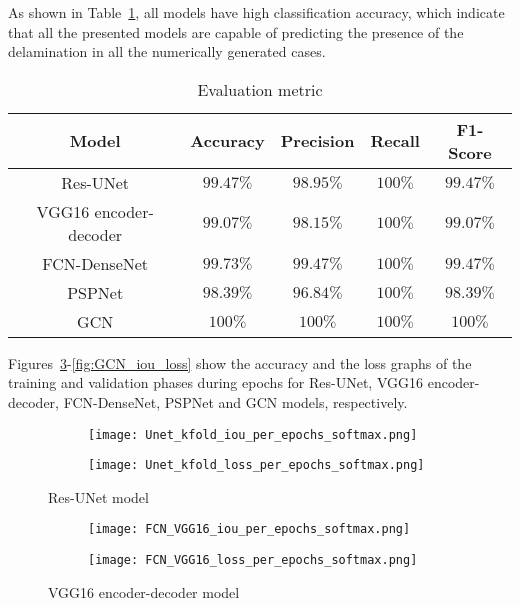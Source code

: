 As shown in Table~\ref{tab:evaluation_metric}, all models have high classification accuracy, which indicate that all the presented models are capable of predicting the presence of the delamination in all the numerically generated cases. 
\begin{table}[]
	\centering
	\caption{Evaluation metric}
	\label{tab:evaluation_metric}
	\resizebox{\textwidth}{!}
	{
		\begin{tabular}{ccccc} \hline
			Model& Accuracy & Precision & Recall & F1-Score \\ \hline
			Res-UNet & \(99.47\%\)  & \(98.95\%\) &  \(100\%\)  & \(99.47\%\)  \\ 
			VGG16 encoder-decoder & \(99.07\%\)  & \(98.15\%\) & \(100\%\) &  \(99.07\%\)\\ 
			FCN-DenseNet & \(99.73\%\)  & \(99.47\%\) & \(100\%\)  & \(99.47\%\) \\ 
			PSPNet & \(98.39\%\) & \(96.84\%\) & \(100\%\) & \(98.39\%\) \\ 
			GCN & \(100\%\) & \(100\%\) & \(100\%\) & \(100\%\) \\ \hline
		\end{tabular}
	}
\end{table}
Figures~\ref{fig:res_unet_iou_loss}-\ref{fig:GCN_iou_loss} show the accuracy and the loss graphs of the training and validation phases during epochs for Res-UNet, VGG16 encoder-decoder, FCN-DenseNet, PSPNet and GCN models, respectively.
\begin{figure} [!h]
	\centering
	\begin{subfigure}[b]{0.47\textwidth}
	 \centering		\texttt{[image: Unet\_kfold\_iou\_per\_epochs\_softmax.png]}	\caption{}
	 \label{fig:unet_accuracy_metric}
	\end{subfigure}
	\hfill	
	\begin{subfigure}[b]{0.47\textwidth}
	 \centering
	 \texttt{[image: Unet\_kfold\_loss\_per\_epochs\_softmax.png]}
	 \caption{}
	 \label{fig:unet_loss_metric}
	\end{subfigure}
	\caption{Res-UNet model}
	\label{fig:res_unet_iou_loss}
\end{figure}
\begin{figure}[!h]
	\centering
	\begin{subfigure}[b]{0.47\textwidth}
		\centering
		\texttt{[image: FCN\_VGG16\_iou\_per\_epochs\_softmax.png]}
		\caption{}
		\label{fig:vgg16_accuracy_metric}
	\end{subfigure}		
	\hfill
	\begin{subfigure}[b]{0.47\textwidth}
		\centering
		\texttt{[image: FCN\_VGG16\_loss\_per\_epochs\_softmax.png]}
		\caption{}
		\label{fig:vgg16_loss_metric}
	\end{subfigure}
	\caption{VGG16 encoder-decoder model}
	\label{fig:Vgg16_iou_loss}
\end{figure}

